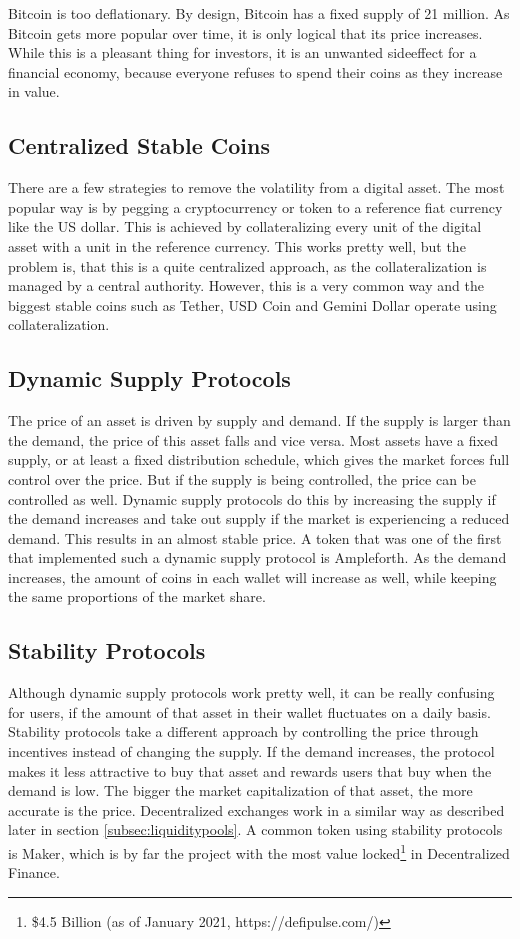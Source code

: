 Bitcoin is too deflationary. By design, Bitcoin has a fixed supply of 21 million. As Bitcoin gets more popular over time, it is only logical that its price increases. While this is a pleasant thing for investors, it is an unwanted sideeffect for a financial economy, because everyone refuses to spend their coins as they increase in value.
\subsection{Centralized Stable Coins}
There are a few strategies to remove the volatility from a digital asset. The most popular way is by pegging a cryptocurrency or token to a reference fiat currency like the US dollar. This is achieved by collateralizing every unit of the digital asset with a unit in the reference currency. This works pretty well, but the problem is, that this is a quite centralized approach, as the collateralization is managed by a central authority. However, this is a very common way and the biggest stable coins such as Tether\cite{Tether2021}, USD Coin\cite{USDCoin2021} and Gemini Dollar\cite{GeminiDollar2021} operate using collateralization.

\subsection{Dynamic Supply Protocols}
The price of an asset is driven by supply and demand. If the supply is larger than the demand, the price of this asset falls and vice versa. Most assets have a fixed supply, or at least a fixed distribution schedule, which gives the market forces full control over the price. But if the supply is being controlled, the price can be controlled as well. Dynamic supply protocols do this by increasing the supply if the demand increases and take out supply if the market is experiencing a reduced demand. This results in an almost stable price. A token that was one of the first that implemented such a dynamic supply protocol is Ampleforth\cite{Ampleforth}. As the demand increases, the amount of coins in each wallet will increase as well, while keeping the same proportions of the market share.

\subsection{Stability Protocols}
Although dynamic supply protocols work pretty well, it can be really confusing for users, if the amount of that asset in their wallet fluctuates on a daily basis. Stability protocols take a different approach by controlling the price through incentives instead of changing the supply. If the demand increases, the protocol makes it less attractive to buy that asset and rewards users that buy when the demand is low. The bigger the market capitalization of that asset, the more accurate is the price. Decentralized exchanges work in a similar way as described later in section \ref{subsec:liquiditypools}. A common token using stability protocols is Maker\cite{MakerDAO2021}, which is by far the project with the most value locked\footnote{\$4.5 Billion (as of January 2021, https://defipulse.com/)} in Decentralized Finance.

